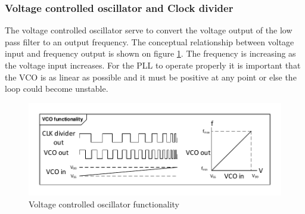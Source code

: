 \subsubsection{Voltage controlled oscillator and Clock divider}
The voltage controlled oscillator serve to convert the voltage output of the low pass filter to an output frequency. The conceptual relationship between voltage input and frequency output is shown on figure \ref{fig:VCO_func}. The frequency is increasing as the voltage input increases. For the PLL to operate properly it is important that the VCO is as linear as possible and it must be positive at any point or else the loop could become unstable.
\begin{figure}[H]
	\centering
	\includegraphics[width=1\textwidth]{billeder/10technologystudies/VCO_functionality}
	\caption{Voltage controlled oscillator functionality}
	\label{fig:VCO_func}
\end{figure}



